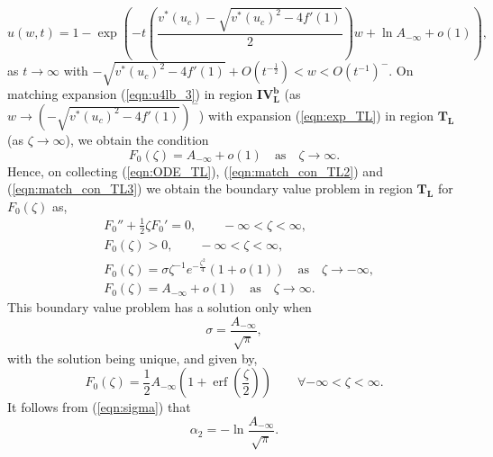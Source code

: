 \documentclass[11pt,a4paper]{article}
\newcommand{\eeref}[1]{(\ref{eqn:#1})}
\newcommand{\eelab}[1]{\label{eqn:#1}}
\def\beq{\begin{equation}}
\def\eeq{\end{equation}}
\DeclareMathOperator\erf{erf}
\begin{document}
\beq \eelab{u4lb_3}
u(w,t) = 1 - \exp \left( -t  \left( \frac{v^*(u_c) - \sqrt{v^*(u_c)^2 - 4f'(1)}}{2} \right) w  + \ln A_{-\infty} + o \left(1 \right)  \right),
\eeq
as $t \to \infty$ with $-  \sqrt{v^*(u_c)^2 -  4 f'(1)} + O(t^{-\frac{1}{2}}) < w < O(t^{-1})^-$. On matching expansion \eeref{u4lb_3} in region $\mathbf{IV_L^b}$ (as $w \to (-  \sqrt{v^*(u_c)^2 -  4 f'(1)})^-$) with expansion \eeref{exp_TL} in region $\mathbf{T_L}$ (as $\zeta \to \infty$), we obtain the condition
\beq \eelab{match_con_TL3}
F_0(\zeta) = A_{-\infty} + o(1) \quad \mbox{as} \quad \zeta \to  \infty.
\eeq
Hence, on collecting \eeref{ODE_TL}, \eeref{match_con_TL2} and \eeref{match_con_TL3} we obtain the boundary value problem in region $\mathbf{T_L}$ for $F_0(\zeta)$ as,
\begin{subequations} \eelab{BVP_TL}
  \begin{align}
& F_0'' + \frac{1}{2}\zeta F_0'= 0, \qquad - \infty < \zeta < \infty ,   \eelab{BVP_TL1}    \\
& F_0(\zeta)> 0, \qquad - \infty < \zeta < \infty,    \\
& F_0(\zeta) = \sigma \zeta^{-1} e^{- \frac{\zeta^2}{4}} \left(1 + o(1) \right) \quad \mbox{as} \quad \zeta \to  - \infty , \eelab{BVP_TL2}     \\
& F_0(\zeta) = A_{-\infty} + o(1) \quad \mbox{as} \quad \zeta \to  \infty . \eelab{BVP_TL3}
\end{align}  
\end{subequations}
This boundary value problem has a solution only when 
\beq \eelab{sigma}
\sigma= \frac{A_{-\infty}}{\sqrt{\pi}},
\eeq
with the solution being unique, and given by, 
\beq
F_0(\zeta) = \frac{1}{2} A_{-\infty} \left(1 + \erf \left( \frac{\zeta}{2} \right) \right)\qquad \forall - \infty < \zeta < \infty.
\eeq
It follows from \eeref{sigma} that
\beq
\alpha_2 = - \ln \frac{A_{-\infty}}{\sqrt{\pi}}.
\eeq
\end{document}
